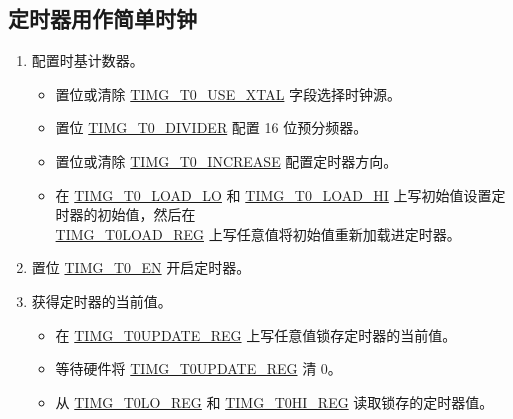 \documentclass[main\_\_CN.tex]{subfiles}
\begin{document}
\subsection{定时器用作简单时钟}\label{sec:timg-func-descr-simple-clock}
\begin{enumerate}
    \item 配置时基计数器。
        \begin{itemize}
        \item 置位或清除 \hyperref[fielddesc:TIMGTXUSEXTAL]{TIMG\_T0\_USE\_XTAL} 字段选择时钟源。
        \item 置位 \hyperref[fielddesc:TIMGTXDIVIDER]{TIMG\_T0\_DIVIDER} 配置 16 位预分频器。
        \item 置位或清除 \hyperref[fielddesc:TIMGTXINCREASE]{TIMG\_T0\_INCREASE} 配置定时器方向。
        \item 在 \hyperref[fielddesc:TIMGTXLOADLO]{TIMG\_T0\_LOAD\_LO} 和 \hyperref[fielddesc:TIMGTXLOADHI]{TIMG\_T0\_LOAD\_HI} 上写初始值设置定时器的初始值，然后在 \\\hyperref[regdesc:TIMGTXLOADREG]{TIMG\_T0LOAD\_REG} 上写任意值将初始值重新加载进定时器。
    \end{itemize}
    \item 置位 \hyperref[fielddesc:TIMGTXEN]{TIMG\_T0\_EN} 开启定时器。
    \item 获得定时器的当前值。
    \begin{itemize}
        \item 在 \hyperref[regdesc:TIMGTXUPDATEREG]{TIMG\_T0UPDATE\_REG} 上写任意值锁存定时器的当前值。
        \item 等待硬件将 \hyperref[regdesc:TIMGTXUPDATEREG]{TIMG\_T0UPDATE\_REG} 清 0。
        \item 从 \hyperref[regdesc:TIMGTXLOREG]{TIMG\_T0LO\_REG} 和 \hyperref[regdesc:TIMGTXHIREG]{TIMG\_T0HI\_REG} 读取锁存的定时器值。 
    \end{itemize}   
\end{enumerate}
\end{document}
